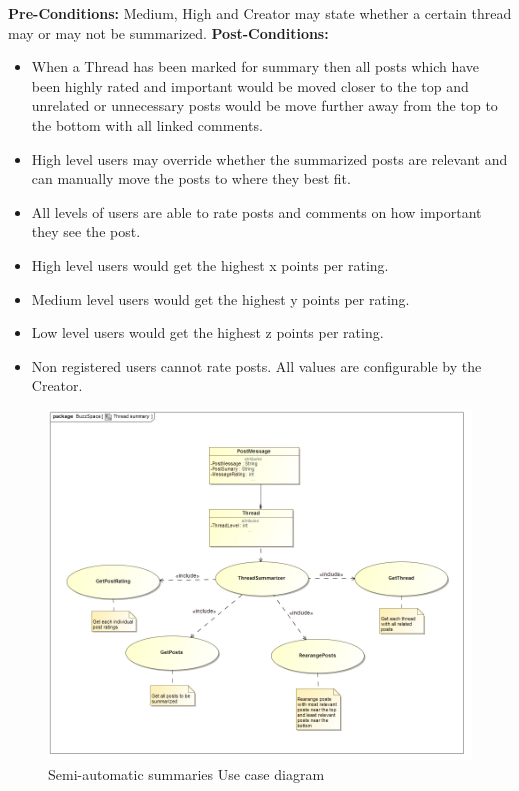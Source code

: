 \documentclass[11pt]{article}
\begin{document}
\begin{enumerate}
\begin{itemize}
	\textbf{Pre-Conditions: }
	\newline Medium, High and Creator may state whether a certain thread may or may not be summarized.
	\newline\textbf{Post-Conditions: }
	\begin{itemize}
		\item When a Thread has been marked for summary then all posts which have been highly rated and important would be moved closer to the top and 	unrelated or unnecessary posts would be move further away from the top to the bottom with all linked comments. 
		\item High level users may override whether the summarized posts are relevant and can manually move the posts to where they best fit.
		\item All levels of users are able to rate posts and comments on how important they see the post.
		\item High level users would get the highest x points per rating.
		\item Medium level users would get the highest y points per rating.
		\item Low level users would get the highest z points per rating.
		\item Non registered users cannot rate posts.
		All values are configurable by the Creator.
	\end{itemize}

 \graphicspath{ {../Diagrams/Andrew/} }
			 \begin{figure}[H]	
			 	  			\includegraphics[scale=0.5]{B3UseCase.png}
							\caption{Semi-automatic summaries Use case diagram}
			 	  		\end{figure}
			 	  		

\end{itemize}
\end{enumerate}
\end{document}
